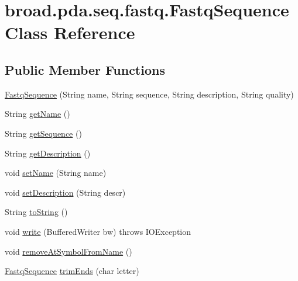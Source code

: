 \hypertarget{classbroad_1_1pda_1_1seq_1_1fastq_1_1_fastq_sequence}{\section{broad.\+pda.\+seq.\+fastq.\+Fastq\+Sequence Class Reference}
\label{classbroad_1_1pda_1_1seq_1_1fastq_1_1_fastq_sequence}
}
\subsection*{Public Member Functions}
\begin{DoxyCompactItemize}
\item 
\hyperlink{classbroad_1_1pda_1_1seq_1_1fastq_1_1_fastq_sequence_a425b7f3bcef700125d1e1b429c1a44c4}{Fastq\+Sequence} (String name, String sequence, String description, String quality)
\item 
String \hyperlink{classbroad_1_1pda_1_1seq_1_1fastq_1_1_fastq_sequence_a9916fe4f95c1f85be1b3d778fca6ff39}{get\+Name} ()
\item 
String \hyperlink{classbroad_1_1pda_1_1seq_1_1fastq_1_1_fastq_sequence_a60e407f2f62ab4e72667fa19f9f7b6e8}{get\+Sequence} ()
\item 
String \hyperlink{classbroad_1_1pda_1_1seq_1_1fastq_1_1_fastq_sequence_ab2a40eee8f89ade0fa9d3e202322b4ae}{get\+Description} ()
\item 
void \hyperlink{classbroad_1_1pda_1_1seq_1_1fastq_1_1_fastq_sequence_a27baaec0fecb339510d4f4116ef50c0c}{set\+Name} (String name)
\item 
void \hyperlink{classbroad_1_1pda_1_1seq_1_1fastq_1_1_fastq_sequence_ab945b06e5aeb8495de038ce68a3eafb9}{set\+Description} (String descr)
\item 
String \hyperlink{classbroad_1_1pda_1_1seq_1_1fastq_1_1_fastq_sequence_a0fb82f7b1a96b6786dc5f0fd98fb1d36}{to\+String} ()
\item 
void \hyperlink{classbroad_1_1pda_1_1seq_1_1fastq_1_1_fastq_sequence_a8421885037d468e98bda2ffe423822b0}{write} (Buffered\+Writer bw)  throws I\+O\+Exception
\item 
void \hyperlink{classbroad_1_1pda_1_1seq_1_1fastq_1_1_fastq_sequence_ae95906f4b4a567882f6509e5e80ac316}{remove\+At\+Symbol\+From\+Name} ()
\item 
\hyperlink{classbroad_1_1pda_1_1seq_1_1fastq_1_1_fastq_sequence}{Fastq\+Sequence} \hyperlink{classbroad_1_1pda_1_1seq_1_1fastq_1_1_fastq_sequence_a0fd87834d4aa61b88e092f018ae0f7f4}{trim\+Ends} (char letter)

\end{DoxyCompactItemize}
